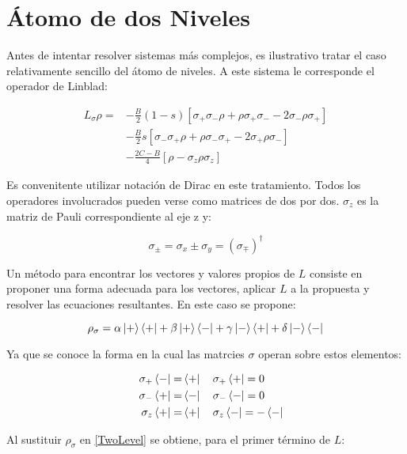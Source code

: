 \documentclass[a4paper,10pt]{report}
\begin{document}
\section{Átomo de dos Niveles}

Antes de intentar resolver sistemas más complejos, es ilustrativo tratar el caso relativamente sencillo del átomo de niveles. A este sistema le corresponde el operador de Linblad:

\begin{align}\label{TwoLevel}
 L_{\sigma}\rho = 
 &-\frac{B}{2}(1-s)[\sigma_+\sigma_-\rho + \rho\sigma_+\sigma_--2\sigma_-\rho\sigma_+ ]\nonumber\\
 &-\frac{B}{2}s[\sigma_-\sigma_+\rho + \rho\sigma_-\sigma_+-2\sigma_+\rho\sigma_- ]\nonumber\\
 &-\frac{2C-B}{4}[\rho - \sigma_z\rho\sigma_z]
\end{align}

Es convenitente utilizar notación de Dirac en este tratamiento. Todos los operadores involucrados pueden verse como matrices de dos por dos. $\sigma_z$ es la matriz de Pauli correspondiente al eje z y:

\begin{equation}
\sigma_{\pm} = \sigma_x \pm \sigma_y = (\sigma_{\mp}) ^\dagger
\end{equation}

Un método \cite{BarnettSD} para encontrar los vectores y valores propios de $L$ consiste en proponer una forma adecuada para los vectores, aplicar $L$ a la propuesta y resolver las ecuaciones resultantes. En este caso se propone:

\begin{equation}
\rho_\sigma = \alpha\Ket{+}\Bra{+}+\beta\Ket{+}\Bra{-}+\gamma\Ket{-}\Bra{+}+\delta\Ket{-}\Bra{-}
\end{equation}

Ya que se conoce la forma en la cual las matrcies $\sigma$ operan sobre estos elementos:

\begin{align*}
&&\sigma_{+}\Bra{-} =& \Bra{+} \quad \sigma_{+}\Bra{+} = 0 \\
&&\sigma_{-}\Bra{+} =& \Bra{-} \quad \sigma_{-}\Bra{-} = 0 \\
&&\sigma_{z}\Bra{+} =& \Bra{+} \quad \sigma_{z}\Bra{-} = -\Bra{-}
\end{align*}

Al sustituir $\rho_{\sigma}$ en \eqref{TwoLevel} se obtiene, para el primer término de $L$:
\end{document}
